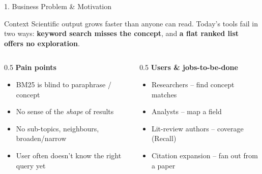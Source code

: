 \documentclass[10pt,aspectratio=169]{beamer}
\begin{document}
\begin{frame}{1. Business Problem \& Motivation}
\begin{block}{Context}
Scientific output grows faster than anyone can read. Today's tools fail in two ways: \textbf{keyword search misses the concept}, and \textbf{a flat ranked list offers no exploration}.
\end{block}

\begin{columns}[T]
\begin{column}{0.5\textwidth}
\textbf{Pain points}
\begin{itemize}
  \item BM25 is blind to paraphrase / concept
  \item No sense of the \emph{shape} of results
  \item No sub-topics, neighbours, broaden/narrow
  \item User often doesn't know the right query yet
\end{itemize}
\end{column}
\begin{column}{0.5\textwidth}
\textbf{Users \& jobs-to-be-done}
\begin{itemize}
  \item Researchers -- find concept matches
  \item Analysts -- map a field
  \item Lit-review authors -- coverage (Recall)
  \item Citation expansion -- fan out from a paper
\end{itemize}
\end{column}
\end{columns}
\end{frame}
\end{document}

